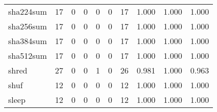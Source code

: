 \begin{longtable}{lp{1.3cm}p{1.3cm}p{1.3cm}p{1.3cm}p{1.3cm}p{1.3cm}p{1.3cm}p{1.3cm}p{1.3cm}}
sha224sum &                     17 &                                             0 &                                            0 &                                           0 &                                            0 &                                         17 &                                1.000 &                                  1.000 &                                1.000 \\
sha256sum &                     17 &                                             0 &                                            0 &                                           0 &                                            0 &                                         17 &                                1.000 &                                  1.000 &                                1.000 \\
sha384sum &                     17 &                                             0 &                                            0 &                                           0 &                                            0 &                                         17 &                                1.000 &                                  1.000 &                                1.000 \\
sha512sum &                     17 &                                             0 &                                            0 &                                           0 &                                            0 &                                         17 &                                1.000 &                                  1.000 &                                1.000 \\
shred     &                     27 &                                             0 &                                            0 &                                           1 &                                            0 &                                         26 &                                0.981 &                                  1.000 &                                0.963 \\
shuf      &                     12 &                                             0 &                                            0 &                                           0 &                                            0 &                                         12 &                                1.000 &                                  1.000 &                                1.000 \\
sleep     &                     12 &                                             0 &                                            0 &                                           0 &                                            0 &                                         12 &                                1.000 &                                  1.000 &                                1.000 \\

\end{longtable}
